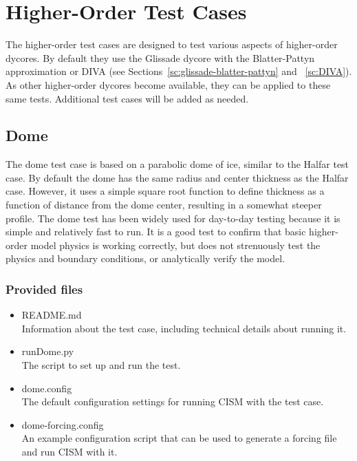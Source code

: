 
\section{Higher-Order Test Cases}
\label{sc:ho-tests}

The higher-order test cases are designed to test various aspects of higher-order dycores.
By default they use the Glissade dycore with the Blatter-Pattyn approximation or DIVA
(see Sections~\ref{sc:glissade-blatter-pattyn} and ~\ref{sc:DIVA}).
As other higher-order dycores become available, they can be applied
to these same tests. Additional test cases will be added as needed.

\subsection{Dome}
The dome test case is based on a parabolic dome of ice, similar to the Halfar test case.
By default the dome has the same radius and center thickness as the Halfar case.
However, it uses a simple square root function to define thickness as a function 
of distance from the dome center, resulting in a somewhat steeper profile.  
The dome test has been widely used for day-to-day testing
because it is simple and relatively fast to run.  It is a good test
to confirm that basic higher-order model physics is working correctly, but does
not strenuously test the physics and boundary conditions, or analytically verify the model.

\subsubsection{Provided files}

\begin{itemize}
	\item README.md \\
		Information about the test case, including technical details about running it.
	\item runDome.py \\
		The script to set up and run the test.
 	 \item dome.config \\
  		The default configuration settings for running CISM with the test case.
  	\item dome-forcing.config \\
  		An example configuration script that can be used to generate a forcing file and run CISM with it.
\end{itemize}

